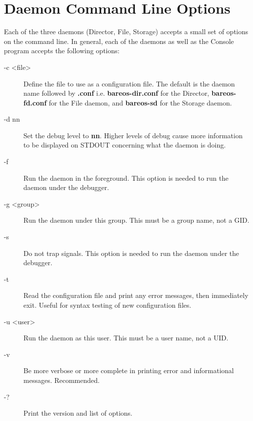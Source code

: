 \section{Daemon Command Line Options}

Each of the three daemons (Director, File, Storage) accepts a small set of
options on the command line. In general, each of the daemons as well as the
Console program accepts the following options:

\begin{description}

\item [-c {\textless}file{\textgreater}]
   Define the file to use as a  configuration file. The default is the daemon
   name followed  by {\bf .conf} i.e. {\bf bareos-dir.conf} for the Director,
   {\bf bareos-fd.conf} for the File daemon, and {\bf bareos-sd}  for the Storage
   daemon.

\item [-d nn]
   Set the debug level to {\bf nn}. Higher levels  of debug cause more
   information to be displayed on STDOUT concerning  what the daemon is doing.

\item [-f]
   Run the daemon in the foreground. This option is  needed to run the daemon
   under the debugger.

\item [-g <group>]
   Run the daemon under this group.  This must be a group name, not a GID.

\item [-s]
   Do not trap signals. This option is needed to run  the daemon under the
   debugger.

\item [-t]
   Read the configuration file and print any error messages,  then immediately
   exit. Useful for syntax testing of  new configuration files.

\item [-u <user>]
   Run the daemon as this user.  This must be a user name, not a UID.

\item [-v]
   Be more verbose or more complete in printing error  and informational
   messages. Recommended.

\item [-?]
   Print the version and list of options.

\end{description}


